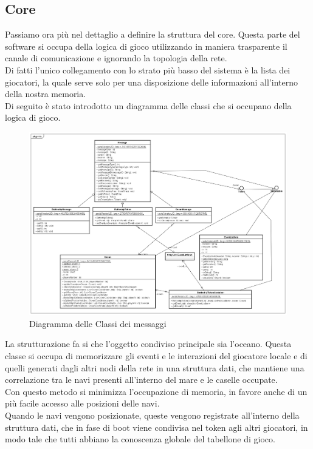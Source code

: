 \documentclass{llncs}
\begin{document}
\subsection{Core}
Passiamo ora più nel dettaglio a definire la struttura del core. Questa parte del software si occupa della logica di gioco utilizzando in maniera trasparente il canale di comunicazione e ignorando la topologia della rete.\\
Di fatti l'unico collegamento con lo strato più basso del sistema è la lista dei giocatori, la quale serve solo per una disposizione delle informazioni all'interno della nostra memoria.\\
Di seguito è stato introdotto un diagramma delle classi che si occupano della logica di gioco.
\begin{figure}[H]
\centering
    \includegraphics[width=12cm]{imgs/BattleshipMessageDiagram.png}
     \caption{Diagramma delle Classi dei messaggi}
   \label{output:blacknoxis_normal}
\end{figure}
La strutturazione fa si che l'oggetto condiviso principale sia l'oceano. Questa classe si occupa di memorizzare gli eventi e le interazioni del giocatore locale e di quelli generati dagli altri nodi della rete in una struttura dati, che mantiene una correlazione tra le navi presenti all'interno del mare e le caselle occupate.\\
Con questo metodo si minimizza l'occupazione di memoria, in favore anche di un più facile accesso alle posizioni delle navi.\\
Quando le navi vengono posizionate, queste vengono registrate all'interno della struttura dati, che in fase di boot viene condivisa nel token agli altri giocatori, in modo tale che tutti abbiano la conoscenza globale del tabellone di gioco.\\
\end{document}
